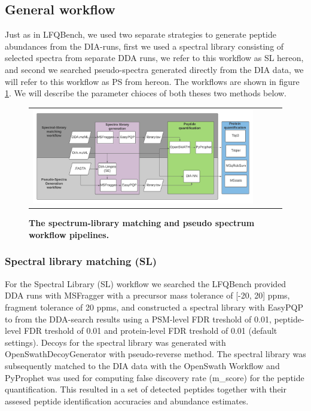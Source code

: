 \documentclass[10pt,letterpaper]{article}
\begin{document}
\subsection*{General workflow}

Just as in LFQBench, we used two separate strategies to generate peptide abundances from the DIA-runs, first we used a spectral library consisting of selected spectra from separate DDA runs, we refer to this workflow as SL hereon, and second we searched pseudo-spectra generated directly from the DIA data, we will refer to this workflow as PS from hereon. The workflows are shown in figure \ref{fig:flowchart}. We will describe the parameter chioces of both theses two methods below.

\begin{figure}[htp]
    \centering
    \begin{tabular}{lclc} 


        \includegraphics[width=1.1\linewidth]{../../result/report_plots/DIA_benchmark_truncated.png} 
    \end{tabular}

        \caption{{\bf The spectrum-library matching and pseudo spectrum workflow pipelines.}}
      \label{fig:flowchart}
\end{figure}



\subsubsection*{Spectral library matching (SL)}

For the Spectral Library (SL) workflow we searched the LFQBench provided DDA runs with MSFragger\cite{kong2017msfragger} with a precursor mass tolerance of [-20, 20] ppms, fragment tolerance of 20 ppms, and constructed a spectral library with EasyPQP \cite{easypqp} to from the DDA-search results using a PSM-level FDR treshold of 0.01, peptide-level FDR treshold of 0.01 and protein-level FDR treshold of 0.01 (default settings). Decoys for the spectral library was generated with OpenSwathDecoyGenerator with pseudo-reverse method. The spectral library was subsequently matched to the DIA data with the OpenSwath Workflow and  PyProphet\cite{teleman2015diana} was used for computing false discovery rate (m\_score) for the peptide quantification. This resulted in a set of detected peptides together with their assesed peptide identification accuracies and abundance estimates.
\end{document}
